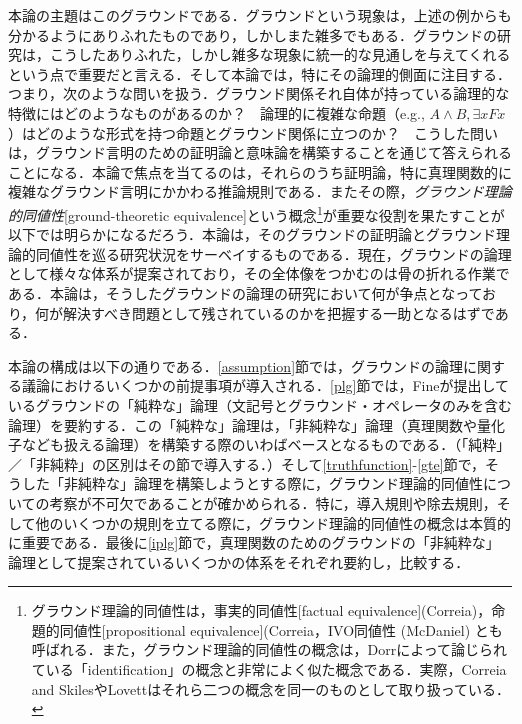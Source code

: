 \documentclass[twoside,14Q,dvipdfmx]{jsarticle}
\theoremstyle{definition}
\begin{document}
本論の主題はこのグラウンドである．グラウンドという現象は，上述の例からも分かるようにありふれたものであり，しかしまた雑多でもある．グラウンドの研究は，こうしたありふれた，しかし雑多な現象に統一的な見通しを与えてくれるという点で重要だと言える．そして本論では，特にその論理的側面に注目する．つまり，次のような問いを扱う．グラウンド関係それ自体が持っている論理的な特徴にはどのようなものがあるのか？　論理的に複雑な命題（e.g., $A\land B, \exists xFx$）はどのような形式を持つ命題とグラウンド関係に立つのか？　こうした問いは，グラウンド言明のための証明論と意味論を構築することを通じて答えられることになる．本論で焦点を当てるのは，それらのうち証明論，特に真理関数的に複雑なグラウンド言明にかかわる推論規則である．またその際，\emph{グラウンド理論的同値性}[ground-theoretic equivalence]という概念\footnote{グラウンド理論的同値性は，事実的同値性[factual equivalence](Correia\cite{Correia2010})，命題的同値性[propositional equivalence](Correia\cite{Correia2017}，IVO同値性 (McDaniel\cite{McDaniel2015}) とも呼ばれる．また，グラウンド理論的同値性の概念は，Dorr\cite{Dorr2016}によって論じられている「identification」の概念と非常によく似た概念である．実際，Correia and Skiles\cite{CorreiaandSkiles2019}やLovett\cite{Lovett2020}はそれら二つの概念を同一のものとして取り扱っている．}が重要な役割を果たすことが以下では明らかになるだろう．本論は，そのグラウンドの証明論とグラウンド理論的同値性を巡る研究状況をサーベイするものである．現在，グラウンドの論理として様々な体系が提案されており，その全体像をつかむのは骨の折れる作業である．本論は，そうしたグラウンドの論理の研究において何が争点となっており，何が解決すべき問題として残されているのかを把握する一助となるはずである．

本論の構成は以下の通りである．\ref{assumption}節では，グラウンドの論理に関する議論におけるいくつかの前提事項が導入される．\ref{plg}節では，Fine\cite{Fine2012a,Fine2012b}が提出しているグラウンドの「純粋な」論理（文記号とグラウンド・オペレータのみを含む論理）を要約する．この「純粋な」論理は，「非純粋な」論理（真理関数や量化子なども扱える論理）を構築する際のいわばベースとなるものである．（「純粋」／「非純粋」の区別はその節で導入する．）そして\ref{truthfunction}-\ref{gte}節で，そうした「非純粋な」論理を構築しようとする際に，グラウンド理論的同値性についての考察が不可欠であることが確かめられる．特に，導入規則や除去規則，そして他のいくつかの規則を立てる際に，グラウンド理論的同値性の概念は本質的に重要である．最後に\ref{iplg}節で，真理関数のためのグラウンドの「非純粋な」論理として提案されているいくつかの体系をそれぞれ要約し，比較する．
%
%
%
\end{document}
